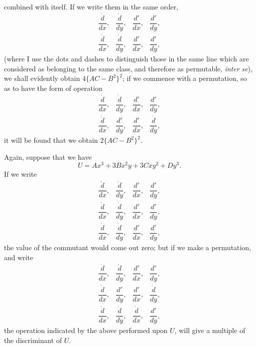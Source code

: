 \documentclass[11pt]{article}
\newcommand{\sourcepage}[1]{\marginpar{\scriptsize p.~#1}}
\begin{document}
{{\sourcepage{320}
combined with itself. If we write them in the same order,
\[
\begin{array}{cccc}
\dfrac{\dot d}{dx},&\dfrac{\dot d}{dy},&\dfrac{d'}{dx},&\dfrac{d'}{dy},\\[0.6em]
\dfrac{\dot d}{dx},&\dfrac{\dot d}{dy},&\dfrac{d'}{dx},&\dfrac{d'}{dy},
\end{array}
\]
(where I use the dots and dashes to distinguish those in the same line which are considered as belonging to the same class, and therefore as permutable, \emph{inter se}), we shall evidently obtain $4\{AC-B^2\}^2$; if we commence with a permutation, so as to have the form of operation
\[
\begin{array}{cccc}
\dfrac{\dot d}{dx},&\dfrac{\dot d}{dy},&\dfrac{d'}{dx},&\dfrac{d'}{dy},\\[0.6em]
\dfrac{\dot d}{dx},&\dfrac{d'}{dy},&\dfrac{d'}{dx},&\dfrac{\dot d}{dy},
\end{array}
\]
it will be found that we obtain $2\{AC-B^2\}^2$.

Again, suppose that we have
\[
U=Ax^3+3Bx^2y+3Cxy^2+Dy^3.
\]
If we write
\[
\begin{array}{cccc}
\dfrac{\dot d}{dx},&\dfrac{\dot d}{dy},&\dfrac{d'}{dx},&\dfrac{d'}{dy},\\[0.6em]
\dfrac{\dot d}{dx},&\dfrac{\dot d}{dy},&\dfrac{d'}{dx},&\dfrac{d'}{dy},\\[0.6em]
\dfrac{\dot d}{dx},&\dfrac{\dot d}{dy},&\dfrac{d'}{dx},&\dfrac{d'}{dy},
\end{array}
\]
the value of the commutant would come out zero; but if we make a permutation, and write
\[
\begin{array}{cccc}
\dfrac{\dot d}{dx},&\dfrac{\dot d}{dy},&\dfrac{d'}{dx},&\dfrac{d'}{dy},\\[0.6em]
\dfrac{\dot d}{dx},&\dfrac{d'}{dy},&\dfrac{d'}{dx},&\dfrac{\dot d}{dy},\\[0.6em]
\dfrac{\dot d}{dx},&\dfrac{\dot d}{dy},&\dfrac{\dot d}{dx},&\dfrac{d'}{dy},
\end{array}
\]
the operation indicated by the above performed upon $U$, will give a multiple of the discriminant of $U$.

}}
\end{document}
